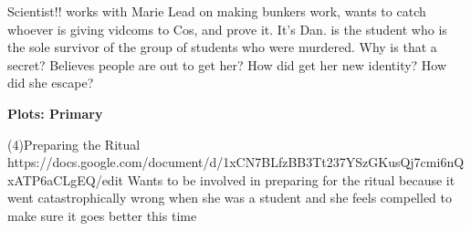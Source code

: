 \documentclass[char]{GL2020}
\begin{document}
\name{\cAssistantScientist{}}








Scientist!!
works with Marie
Lead on making bunkers work, wants to catch whoever is giving vidcoms to Cos, and prove it.  It's Dan.
\cAssistantScientist{} is the student who is the sole survivor of the group of students who were murdered.  Why is that a secret?  Believes people are out to get her?  How did \cAssistantScientist{} get her new identity?  How did she escape?

\textbf{Plots: Primary}

(4)Preparing the Ritual
https://docs.google.com/document/d/1xCN7BLfzBB3Tt237YSzGKusQj7cmi6nQxATP6aCLgEQ/edit
Wants to be involved in preparing for the ritual because it went catastrophically wrong when she was a student and she feels compelled to make sure it goes better this time
\end{document}
